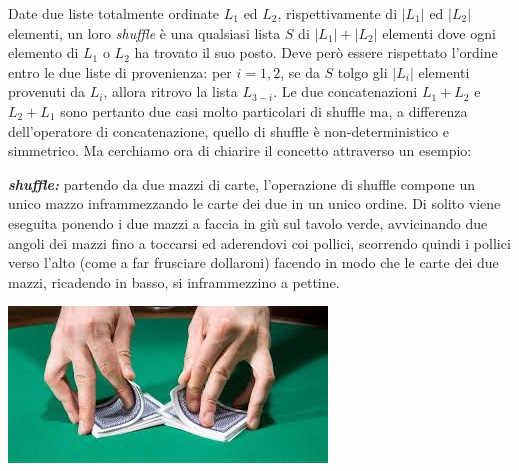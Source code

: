 \renewcommand{\nomebreve}{is\_shuffle\_of}
\renewcommand{\titolo}{Can a deck of cards be obtained as the shuffle of two?}

\introduzione{}

Date due liste totalmente ordinate $L_1$ ed $L_2$, rispettivamente di $|L_1|$ ed $|L_2|$ elementi, un loro \emph{shuffle} è una qualsiasi lista $S$ di $|L_1|+|L_2|$ elementi dove ogni elemento di $L_1$ o $L_2$ ha trovato il suo posto. Deve però essere rispettato l'ordine entro le due liste di provenienza:
per $i=1,2$, se da $S$ tolgo gli $|L_i|$ elementi provenuti da $L_i$, allora ritrovo la lista $L_{3-i}$.
Le due concatenazioni $L_1+L_2$ e $L_2+L_1$ sono pertanto due casi molto particolari di shuffle ma, a differenza dell'operatore di concatenazione, quello di shuffle è non-deterministico e simmetrico.  
Ma cerchiamo ora di chiarire il concetto attraverso un esempio:\\

\noindent
  \begin{minipage}[c]{.48\textwidth}
     \emph{\bf shuffle:}\/ partendo da due mazzi di carte, l'operazione di shuffle compone un unico mazzo inframmezzando le carte dei due in un unico ordine. Di solito viene eseguita ponendo i due mazzi a faccia in giù sul tavolo verde, avvicinando due angoli dei mazzi fino a toccarsi ed aderendovi coi pollici, scorrendo quindi i pollici verso l'alto (come a far frusciare dollaroni) facendo in modo che le carte dei due mazzi, ricadendo in basso, si inframmezzino a pettine.
   \end{minipage}%
\hspace{8.0mm}%
\begin{minipage}[c]{.50\textwidth}
   \includegraphics[scale=0.7]{figs/card_shuffle.jpeg}
\end{minipage}

\medskip

